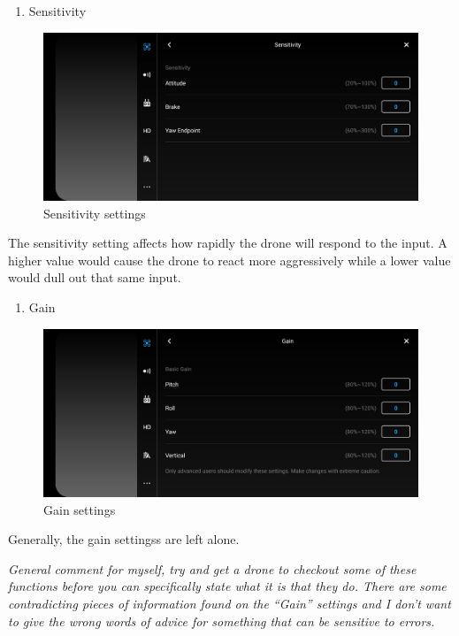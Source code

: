 \documentclass[
]{book}
\providecommand{\tightlist}{%
  \setlength{\itemsep}{0pt}\setlength{\parskip}{0pt}}
\begin{document}
\begin{enumerate}
\def\labelenumi{\arabic{enumi}.}
\setcounter{enumi}{1}
\tightlist
\item
  Sensitivity
\end{enumerate}

\begin{figure}
\centering
\includegraphics{images/MC/DJI-SensitivitySettings.jpg}
\caption{Sensitivity settings}
\end{figure}

The sensitivity setting affects how rapidly the drone will respond to the input. A higher value would cause the drone to react more aggressively while a lower value would dull out that same input.

\begin{enumerate}
\def\labelenumi{\arabic{enumi}.}
\setcounter{enumi}{2}
\tightlist
\item
  Gain
\end{enumerate}

\begin{figure}
\centering
\includegraphics{images/MC/DJI-GainSettings.jpg}
\caption{Gain settings}
\end{figure}

Generally, the gain settingss are left alone.

\emph{General comment for myself, try and get a drone to checkout some of these functions before you can specifically state what it is that they do. There are some contradicting pieces of information found on the ``Gain'' settings and I don't want to give the wrong words of advice for something that can be sensitive to errors.}
\end{document}
